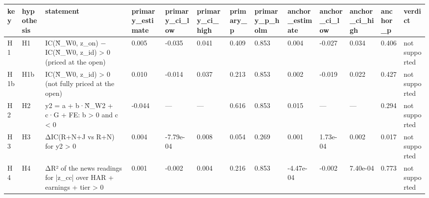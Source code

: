 \begin{tabular}{lllllllllllll}
\toprule
key & hypothesis & statement & primary\_estimate & primary\_ci\_low & primary\_ci\_high & primary\_p & primary\_p\_holm & anchor\_estimate & anchor\_ci\_low & anchor\_ci\_high & anchor\_p & verdict \\
\midrule
H1 & H1 & IC(N̂\_W0, z\_on) − IC(N̂\_W0, z\_id) > 0 (priced at the open) & 0.005 & -0.035 & 0.041 & 0.409 & 0.853 & 0.004 & -0.027 & 0.034 & 0.406 & not supported \\
H1b & H1b & IC(N̂\_W0, z\_id) > 0 (not fully priced at the open) & 0.010 & -0.014 & 0.037 & 0.213 & 0.853 & 0.002 & -0.019 & 0.022 & 0.427 & not supported \\
H2 & H2 & y2 = a + b·N̂\_W2 + c·G + FE: b > 0 and c < 0 & -0.044 & — & — & 0.616 & 0.853 & 0.015 & — & — & 0.294 & not supported \\
H3 & H3 & ΔIC(R+N+J vs R+N) for y2 > 0 & 0.004 & -7.79e-04 & 0.008 & 0.054 & 0.269 & 0.001 & 1.73e-04 & 0.002 & 0.017 & not supported \\
H4 & H4 & ΔR² of the news readings for |z\_cc| over HAR + earnings + tier > 0 & 0.001 & -0.002 & 0.004 & 0.216 & 0.853 & -4.47e-04 & -0.002 & 7.40e-04 & 0.773 & not supported \\
\bottomrule
\end{tabular}
